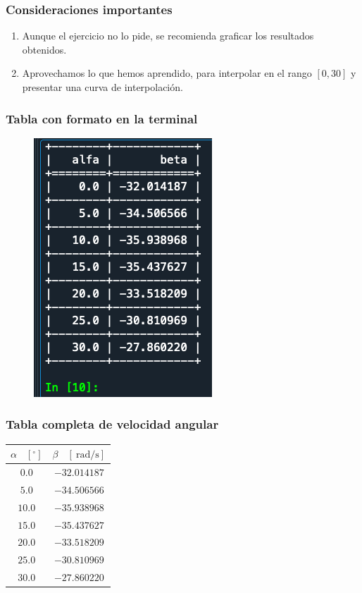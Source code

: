\documentclass[12pt]{beamer}
\begin{document}
\begin{frame}
\frametitle{Consideraciones importantes}
\begin{enumerate}[<+->]
\conti
\item Aunque el ejercicio no lo pide, se recomienda graficar los resultados obtenidos.
\item Aprovechamos lo que hemos aprendido, para interpolar en el rango $[0, 30]$ y presentar una curva de interpolación.
\end{enumerate}
\end{frame}
\begin{frame}
\frametitle{Tabla con formato en la terminal}
\begin{figure}
    \centering
    \includegraphics[scale=0.5]{Imagenes/diferenciacion_ejercicio_segmento_tabla.png}
\end{figure}
\end{frame}
\begin{frame}
\frametitle{Tabla completa de velocidad angular}
\begin{table}
\centering
\renewcommand{\arraystretch}{0.9}
\begin{tabular}{c | c}
$\alpha$ \, $[{}^{\circ}]$ & $\beta$ \, $[\SI{}{\radian\per\second}]$ \\ \hline
$0.0$ & $-32.014187$ \\ \hline
$5.0$ & $-34.506566$ \\ \hline
$10.0$ & $-35.938968$ \\ \hline
$15.0$ & $-35.437627$ \\ \hline
$20.0$ & $-33.518209$ \\ \hline
$25.0$ & $-30.810969$ \\ \hline
$30.0$ & $-27.860220$ \\ \hline
\end{tabular}
\end{table}
\end{frame}
\end{document}
